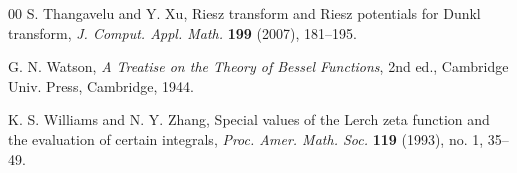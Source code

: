 \documentclass[a4paper]{amsart}
\theoremstyle{plain}
\theoremstyle{definition}
\theoremstyle{remark}
\numberwithin{equation}{section}
\begin{document}
\begin{thebibliography}{00}
S. Thangavelu and Y. Xu,
Riesz transform and Riesz potentials for Dunkl transform,
\textit{J. Comput. Appl. Math.}
\textbf{199} (2007), 181--195.

G. N. Watson,
\textit{A Treatise on the Theory of Bessel Functions}, 2nd ed.,
Cambridge Univ. Press,
Cambridge, 1944.

K. S. Williams and N. Y. Zhang, 
Special values of the Lerch zeta function and the evaluation of certain integrals, 
\textit{Proc. Amer. Math. Soc.} \textbf{119} (1993), no. 1, 35--49.


\end{thebibliography}

\end{document}
